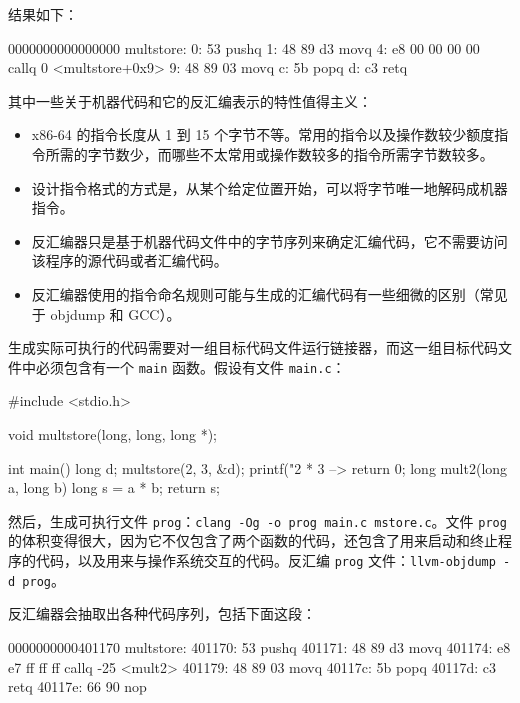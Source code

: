 结果如下：

\begin{textcode}
0000000000000000 multstore:
    0: 53                               pushq   %
    1: 48 89 d3                         movq    %
    4: e8 00 00 00 00                   callq   0 <multstore+0x9>
    9: 48 89 03                         movq    %
    c: 5b                               popq    %
    d: c3                               retq
\end{textcode}

其中一些关于机器代码和它的反汇编表示的特性值得主义：

\begin{itemize}
    \item x86-64 的指令长度从 1 到 15 个字节不等。常用的指令以及操作数较少额度指令所需的字节数少，而哪些不太常用或操作数较多的指令所需字节数较多。
    \item 设计指令格式的方式是，从某个给定位置开始，可以将字节唯一地解码成机器指令。
    \item 反汇编器只是基于机器代码文件中的字节序列来确定汇编代码，它不需要访问该程序的源代码或者汇编代码。
    \item 反汇编器使用的指令命名规则可能与生成的汇编代码有一些细微的区别（常见于 objdump 和 GCC）。
\end{itemize}

生成实际可执行的代码需要对一组目标代码文件运行链接器，而这一组目标代码文件中必须包含有一个 \verb|main| 函数。假设有文件 \verb|main.c|：

\begin{cppcode}
#include <stdio.h>

void multstore(long, long, long *);

int main() {
  long d;
  multstore(2, 3, &d);
  printf("2 * 3 --> %
  return 0;
}
long mult2(long a, long b) {
  long s = a * b;
  return s;
}
\end{cppcode}

然后，生成可执行文件 \verb|prog|：\verb|clang -Og -o prog main.c mstore.c|。文件 \verb|prog| 的体积变得很大，因为它不仅包含了两个函数的代码，还包含了用来启动和终止程序的代码，以及用来与操作系统交互的代码。反汇编 \verb|prog| 文件：\verb|llvm-objdump -d prog|。

反汇编器会抽取出各种代码序列，包括下面这段：

\begin{textcode}
0000000000401170 multstore:
  401170: 53                            pushq   %
  401171: 48 89 d3                      movq    %
  401174: e8 e7 ff ff ff                callq   -25 <mult2>
  401179: 48 89 03                      movq    %
  40117c: 5b                            popq    %
  40117d: c3                            retq
  40117e: 66 90                         nop
\end{textcode}

